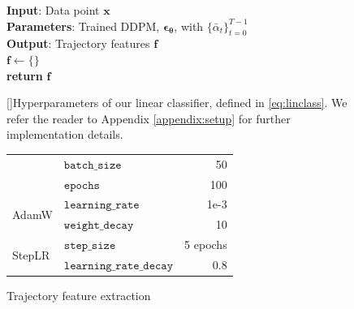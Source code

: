 \documentclass{article}
\theoremstyle{remark}
\begin{document}
\begin{figure}[t]
\begin{minipage}[t]{0.52\textwidth}
\begin{algorithm}[H]
\caption{Trajectory feature extraction}
\label{alg:feats}
\textbf{Input}: Data point $\boldsymbol{x}$\\
\textbf{Parameters}: Trained DDPM, $\boldsymbol{\epsilon}_{\boldsymbol{\theta}}$, with $\{\bar{\alpha}_t\}^{T-1}_{t=0}$\\
\textbf{Output}: Trajectory features $\boldsymbol{f}$ \\
$\boldsymbol{f}\leftarrow\{\}$ \\
\textbf{return} $\boldsymbol{f}$
\end{algorithm}
\end{minipage}
\hfill
\begin{minipage}[t]{0.47\textwidth}
    \captionsetup{hypcap=false}
    []{Hyperparameters of our linear classifier, defined in \eqref{eq:linclass}. We refer the reader to Appendix \ref{appendix:setup} for further implementation details.}
    \centering
    \setlength{\tabcolsep}{1mm}
    \begin{tabular}{@{}llr@{}}
        \toprule
        & $\texttt{batch\_size}$ & 50 \\
        & $\texttt{epochs}$ & 100 \\
        \midrule
        \multirow{ 2}{*}{AdamW }& $\texttt{learning\_rate}$ & 1e-3\\
        & $\texttt{weight\_decay}$ & 10\\
        \midrule
        \multirow{ 2}{*}{StepLR } & $\texttt{step\_size}$ & 5 epochs\\
        & $\texttt{learning\_rate\_decay}$ & 0.8 \\
        \bottomrule
    \end{tabular}
    \label{tab:classifierhyper}
\end{minipage}
\end{figure}
\end{document}
